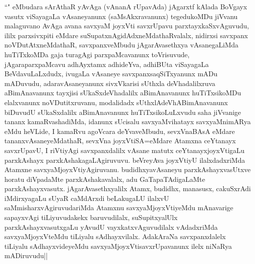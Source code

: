 \begin{artha}
``\stext " eMbudara sArAthaR yAvAga (vAnanA rUpavAda) jAgarxtf kAlada BoVgayx vasutx viSayagaLa vAsaneyanunx (saMsAkxravanunx) tegedukoMDu jiVvanu malaguvano AvAga avana savxyaM joyxVti savxrUpavu parxtayxkaSxvAguvudu, ililx parxsivxpiti eMdare suSupatxnAgidAdxneMdathaRvalalx, nidirxsi savxpanx noVDutAtxneMdathaR, savxpanxveMbudu jAgarAvasethxya vAsanegaLiMda huTiTxkoMDa gaja turagAgi parxpaMcavanunx toVrisuvude, jAgaraparxpaMcavu adhAyxtamx adhideYva, adhiBUta viSayagaLa BeVdavuLaLxdudx, ivugaLa vAsaneye savxpanxsaqSiTxyanunx mADu mADuvudu, adaravAsaneyanunx sivxVkarisi sUthxla deVhadalilxruva aBimAnavanunx tayxjisi sUkaSxdeVhadalilx aBimAnavanunx huTiTxsikoMDu elalxvanunx noVDutitxruvanu, modalidadx sUthxlAdeVhABimAnavanunx biDuvudU sUkaSxdalilx aBimAnavanunx huTiTxsikoLuLxvudu saha jiVvanige tananx kamaRvashadiMda, idanunx sUcisalu savxyaMvihatayx savxyaMnimARya eMdu heVLide, I kamaRvu agoVcara deYvaveMbudu, sevxVnaBAsA eMdare tananxvAsaneyeMdathaR, sevxVna joyxVtiSA=eMdare Atamxna ceYtanayx savxrUpavU, I riVtiyAgi savxpanxdalilx vAsane matutx ceYtanayxjoyxVtigaLu parxkAshayx parxkAshakagaLAgiruvuvu. beVreyAva joyxVtiyU ilalxdadxriMda Atamxne savxyaMjoyxVtiyAgiruvanu. budidhxyavAsaneyu parxkAshayxvasUtxve horatu diVpadaMte parxkAshakavalalx, adu GaTapaTAdigaLaMte parxkAshayxvasutx. jAgarAvasethxyalilx Atamx, budidhx, manasusx, cakuSxrAdi iMdirxyagaLu sUyaR caMdArxdi beLakugaLU ilalxvU saMmisharxvAgiruvudariMda Atamxnu savxyaMjoyxVtiyeMdu mAnavarige sapayxvAgi tiLiyuvudakekx baruvudilalx, suSupitxyalUlx parxkAshayxvasutxgaLu yAvudU vayxkatxvAguvudilalx vAdadxriMda savxyaMjoyxVteMdu tiLiyalu sAdhayxvilalx. AdakAraNa savxpanxdalelx tiLiyalu sAdhayxvideyeMdu savxyaMjoyxVtisavxrUpavanunx ilelx niNaRya mADiruvudu|| 
\end{artha}%

